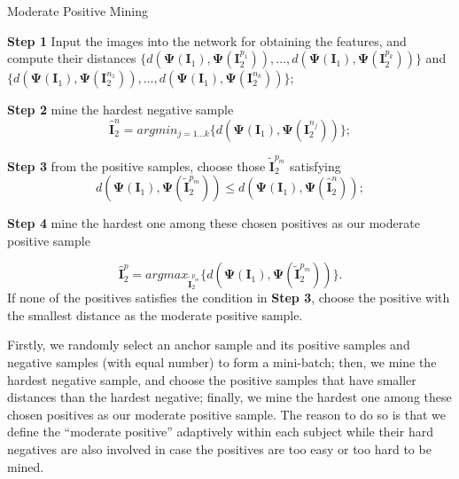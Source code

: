 \documentclass[runningheads]{llncs}
\begin{document}
\begin{algorithm}[h] \label{algorithm-mining}
	\SetAlgoLined \caption{\small Moderate Positive Mining}
	\begin{small}

        \textbf{Step 1}     Input the images into the network for obtaining the features, and compute their distances
        $ \{ d(\mathbf{\Psi}(\mathbf{I}_1), \mathbf{\Psi}(\mathbf{I}_2^{p_1})), \dots, d(\mathbf{\Psi}(\mathbf{I}_1), \mathbf{\Psi}(\mathbf{I}_2^{p_k})) \}$
        and
        $ \{ d(\mathbf{\Psi}(\mathbf{I}_1), \mathbf{\Psi}(\mathbf{I}_2^{n_1})), \dots, d(\mathbf{\Psi}(\mathbf{I}_1), \mathbf{\Psi}(\mathbf{I}_2^{n_k})) \}$;


        \textbf{Step 2}     mine the hardest negative sample $$\hat{\mathbf{I}}_2^n = argmin_{j=1 \dots k}\{ d(\mathbf{\Psi}(\mathbf{I}_1), \mathbf{\Psi}(\mathbf{I}_2^{n_j}))  \};$$

        \textbf{Step 3}     from the positive samples, choose those $ \tilde{\mathbf{I}}_2^{p_m} $ satisfying
        $$ d(\mathbf{\Psi}(\mathbf{I}_1), \mathbf{\Psi}(\tilde{\mathbf{I}}_2^{p_m})) \le d(\mathbf{\Psi}(\mathbf{I}_1), \mathbf{\Psi}(\hat{\mathbf{I}}_2^n)); $$

        \textbf{Step 4}     mine the hardest one among these chosen positives as our moderate positive sample

        $$ \hat{\mathbf{I}}_2^p = argmax_{\tilde{\mathbf{I}}_2^{p_m}} \{ d(\mathbf{\Psi}(\mathbf{I}_1), \mathbf{\Psi}(\tilde{\mathbf{I}}_2^{p_m})) \}. $$
        If none of the positives satisfies the condition in \textbf{Step 3}, choose the positive with the smallest distance as the moderate positive sample.




	\end{small}
	\label{alg:mpm}
\end{algorithm}


Firstly, we randomly select an anchor sample and its positive samples and negative samples (with equal number) to form a mini-batch;
then, we mine the hardest negative sample, and choose the positive samples that have smaller distances than the hardest negative;
finally, we mine the hardest one among these chosen positives as our moderate positive sample.
The reason to do so is that we define the ``moderate positive'' adaptively within each subject while their hard negatives are also involved in case the positives are too easy or too hard to be mined.
\end{document}
